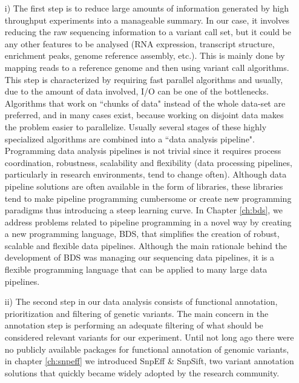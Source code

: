 \begin{itemize}
\item[i)] The first step is to reduce large amounts of information generated by high throughput experiments into a manageable summary. 
In our case, it involves reducing the raw sequencing information to a variant call set, but it could be any other features to be analysed (RNA expression, transcript structure, enrichment peaks, genome reference assembly, etc.). 
This is mainly done by mapping reads to a reference genome and then using variant call algorithms. 
This step is characterized by requiring fast parallel algorithms and usually, due to the amount of data involved, I/O can be one of the bottlenecks. Algorithms that work on ``chunks of data" instead of the whole data-set are preferred, and in many cases exist, because working on disjoint data makes the problem easier to parallelize. 
Usually several stages of these highly specialized algorithms are combined into a ``data analysis pipeline". 
Programming data analysis pipelines is not trivial since it requires process coordination, robustness, scalability and flexibility (data processing pipelines, particularly in research environments, tend to change often). 
Although data pipeline solutions are often available in the form of libraries, these libraries tend to make pipeline programming cumbersome or create new programming paradigms thus introducing a steep learning curve. 
In Chapter \ref{ch:bds}, we address problems related to pipeline programming in a novel way by creating a new programming language, BDS, that simplifies the creation of robust, scalable and flexible data pipelines. 
Although the main rationale behind the development of BDS was managing our sequencing data pipelines, it is a flexible programming language that can be applied to many large data pipelines.

\item[ii)] The second step in our data analysis consists of functional annotation, prioritization and filtering of genetic variants. 
The main concern in the annotation step is performing an adequate filtering of what should be considered relevant variants for our experiment. 
Until not long ago there were no publicly available packages for functional annotation of genomic variants, in chapter \ref{ch:snpeff} we introduced SnpEff \& SnpSift, two variant annotation solutions that quickly became widely adopted by the research community. 


\end{itemize}

